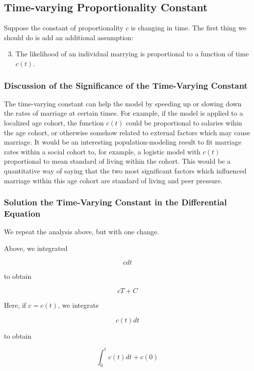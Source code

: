 \documentclass{article}
\begin{document}
\subsection{Time-varying Proportionality Constant}

Suppose the constant of proportionality $c$ is changing in time.
The first thing we should do is add an additional assumption:

\begin{enumerate}
	\setcounter{enumi}{2}
	\item The likelihood of an individual marrying is proportional to
			a function of time $c(t)$.
\end{enumerate}

\subsubsection{Discussion of the Significance of the Time-Varying Constant}

The time-varying constant can help the model by speeding up or slowing down 
	the rates of marriage at certain times.
For example, if the model is applied to a localized age cohort, 
	the function $c(t)$ could be proportional to salaries wihin the age cohort,
	or otherwise somehow related to external factors which may cause marriage.
It would be an interesting population-modeling result to fit marriage rates
	within a social cohort to, for example, a logistic model with $c(t)$ 
	proportional to mean standard of living within the cohort.
This would be a quantitative way of saying that the two most significant factors
	which influenced marriage within this age cohort are standard of living and
	peer pressure.

\subsubsection{Solution the Time-Varying Constant in the Differential Equation}

We repeat the analysis above, but with one change.

Above, we integrated

\[ c dt \]

to obtain

\[ c T + C \]

Here, if $c = c(t)$, we integrate

\[ c(t) dt \]

to obtain

\[ \int_0^t c(t) dt + c(0) \]
\end{document}
